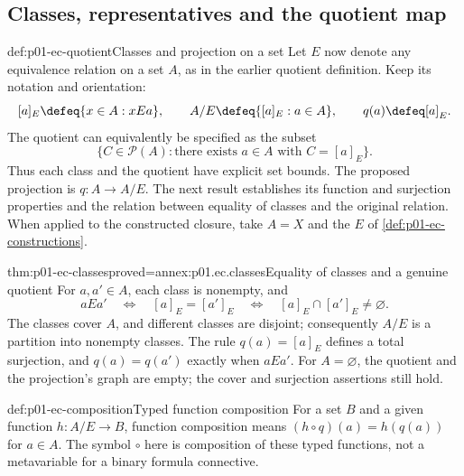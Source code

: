 \subsection{Classes, representatives and the quotient map}

\begin{hbdefinition}{def:p01-ec-quotient}{Classes and projection on a set}
Let \(E\) now denote any equivalence relation on a set \(A\), as in
the earlier quotient definition. Keep its notation and orientation:
\[
 [a]_E\defeq\{x\in A:xEa\},\qquad
 A/E\defeq\{[a]_E:a\in A\},\qquad q(a)\defeq[a]_E.
\]
The quotient can equivalently be specified as the subset
\[
 \{C\in\mathcal P(A):\text{there exists }a\in A\text{ with }C=[a]_E\}.
\]
Thus each class and the quotient have explicit set bounds. The proposed
projection is \(q:A\to A/E\). The next result establishes its function
and surjection properties and the relation between equality of classes
and the original relation. When applied to the constructed closure,
take \(A=X\) and the \(E\) of \cref{def:p01-ec-constructions}.
\end{hbdefinition}

\begin{hbtheorem}{thm:p01-ec-classes}{proved=annex:p01.ec.classes}{Equality of classes and a genuine quotient}
For \(a,a'\in A\), each class is nonempty, and
\[
 aEa'\quad\Longleftrightarrow\quad[a]_E=[a']_E
 \quad\Longleftrightarrow\quad[a]_E\cap[a']_E\ne\varnothing.
\]
The classes cover \(A\), and different classes are disjoint; consequently
\(A/E\) is a partition into nonempty classes. The rule \(q(a)=[a]_E\)
defines a total surjection, and \(q(a)=q(a')\) exactly when \(aEa'\).
For \(A=\varnothing\), the quotient and the projection's graph are
empty; the cover and surjection assertions still hold.
\end{hbtheorem}

\begin{hbconvention}{def:p01-ec-composition}{Typed function composition}
For a set \(B\) and a given function \(h:A/E\to B\), function
composition means \((h\circ q)(a)=h(q(a))\) for \(a\in A\).
The symbol \(\circ\) here is composition of these typed functions,
not a metavariable for a binary formula connective.
\end{hbconvention}

